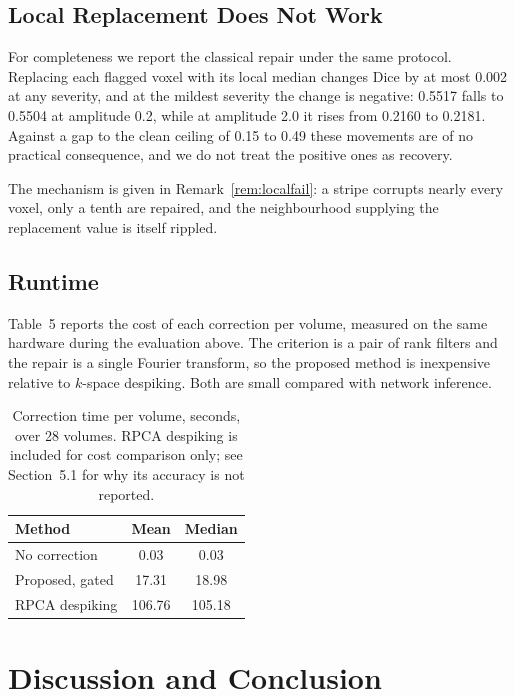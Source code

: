 \documentclass[12pt]{article}
\theoremstyle{definition}
\theoremstyle{plain}
\begin{document}
\subsection{Local Replacement Does Not Work}

For completeness we report the classical repair under the same protocol. Replacing
each flagged voxel with its local median changes Dice by at most 0.002 at any
severity, and at the mildest severity the change is negative: 0.5517 falls to 0.5504
at amplitude 0.2, while at amplitude 2.0 it rises from 0.2160 to 0.2181. Against a
gap to the clean ceiling of 0.15 to 0.49 these movements are of no practical
consequence, and we do not treat the positive ones as recovery.

The mechanism is given in Remark~\ref{rem:localfail}: a stripe corrupts nearly every
voxel, only a tenth are repaired, and the neighbourhood supplying the replacement
value is itself rippled.

\subsection{Runtime}

Table~5 reports the cost of each correction per volume, measured on the same
hardware during the evaluation above. The criterion is a pair of rank filters and
the repair is a single Fourier transform, so the proposed method is inexpensive
relative to $k$-space despiking. Both are small compared with network inference.

\begin{table}[H]
\centering
\caption{Correction time per volume, seconds, over 28 volumes. RPCA despiking is
included for cost comparison only; see Section~5.1 for why its accuracy is not
reported.}
\begin{tabular}{lcc}
\toprule
Method & Mean & Median \\
\midrule
No correction & 0.03 & 0.03 \\
Proposed, gated & 17.31 & 18.98 \\
RPCA despiking & 106.76 & 105.18 \\
\bottomrule
\end{tabular}
\end{table}

\section{Discussion and Conclusion}
\end{document}
